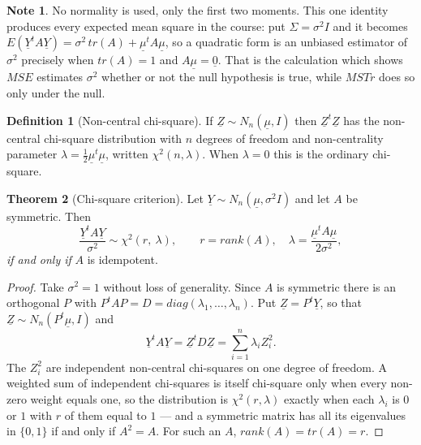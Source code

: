 \documentclass[11pt,a4paper]{article}
\theoremstyle{definition}
\newtheorem{thm}{Theorem}[subsection]
\newtheorem{defn}[thm]{Definition}
\newtheorem*{note}{Note}
\begin{document}
\begin{note}
No normality is used, only the first two moments. This one identity produces
every expected mean square in the course: put $\Sigma=\sigma^2I$ and it
becomes $E\left(\underline{Y}^tA\underline{Y}\right)
=\sigma^2\,tr(A)+\underline{\mu}^tA\underline{\mu}$, so a quadratic form is an
unbiased estimator of $\sigma^2$ precisely when $tr(A)=1$ and
$A\underline{\mu}=\underline{0}$. That is the calculation which shows $MSE$
estimates $\sigma^2$ whether or not the null hypothesis is true, while
$MSTr$ does so only under the null.
\end{note}

\begin{defn}[Non-central chi-square]
If $\underline{Z}\sim N_n\left(\underline{\mu},I\right)$ then
$\underline{Z}^t\underline{Z}$ has the non-central chi-square distribution with
$n$ degrees of freedom and non-centrality parameter
$\lambda=\tfrac{1}{2}\underline{\mu}^t\underline{\mu}$, written
$\chi^2\left(n,\lambda\right)$. When $\lambda=0$ this is the ordinary
chi-square.
\end{defn}

\begin{thm}[Chi-square criterion]
\label{res:thm:chisqcrit}
Let $\underline{Y}\sim N_n\left(\underline{\mu},\sigma^2I\right)$ and let $A$
be symmetric. Then
$$\frac{\underline{Y}^tA\underline{Y}}{\sigma^2}\sim
\chi^2\left(r,\ \lambda\right),\qquad
r=rank(A),\quad \lambda=\frac{\underline{\mu}^tA\underline{\mu}}{2\sigma^2},$$
\emph{if and only if} $A$ is idempotent.
\end{thm}

\begin{proof}
Take $\sigma^2=1$ without loss of generality. Since $A$ is symmetric there is
an orthogonal $P$ with $P^tAP=D=diag\left(\lambda_1,\dots,\lambda_n\right)$.
Put $\underline{Z}=P^t\underline{Y}$, so that
$\underline{Z}\sim N_n\left(P^t\underline{\mu},I\right)$ and
$$\underline{Y}^tA\underline{Y}=\underline{Z}^tD\underline{Z}
=\sum_{i=1}^{n}\lambda_iZ_i^2 .$$
The $Z_i^2$ are independent non-central chi-squares on one degree of freedom.
A weighted sum of independent chi-squares is itself chi-square only when every
non-zero weight equals one, so the distribution is
$\chi^2\left(r,\lambda\right)$ exactly when each $\lambda_i$ is $0$ or $1$
with $r$ of them equal to $1$ --- and a symmetric matrix has all its
eigenvalues in $\{0,1\}$ if and only if $A^2=A$. For such an $A$,
$rank(A)=tr(A)=r$.
\end{proof}
\end{document}
